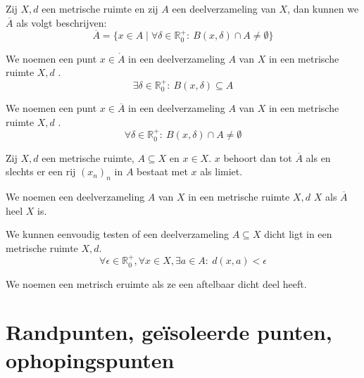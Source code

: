 \documentclass[main.tex]{subfiles}
\begin{document}
\begin{pr}
  Zij $X,d$ een metrische ruimte en zij $A$ een deelverzameling van $X$, dan kunnen we $\overline{A}$ als volgt beschrijven:
  \[ \overline{A} = \{ x\in A \mid \forall \delta \in \mathbb{R}_{0}^{+}:\ B(x,\delta) \cap A \neq \emptyset \} \]
\end{pr}

\begin{de}
  We noemen een punt $x\in \mathring{A}$ in een deelverzameling $A$ van $X$ in een metrische ruimte $X,d$ .
  \[ \exists \delta \in \mathbb{R}_{0}^{+}:\ B(x,\delta) \subseteq A \]
\end{de}

\begin{de}
  We noemen een punt $x\in \overline{A}$ in een deelverzameling $A$ van $X$ in een metrische ruimte $X,d$ .
  \[ \forall \delta \in \mathbb{R}_{0}^{+}:\ B(x,\delta) \cap A \neq \emptyset \]
\end{de}

\begin{pr}
  \label{pr:metrische-ruimte-sluiting-itv-limiet}
  Zij $X,d$ een metrische ruimte, $A \subseteq X$ en $x\in X$.
  $x$ behoort dan tot $\overline{A}$ als en slechts er een rij $(x_{n})_{n}$ in $A$ bestaat met $x$ als limiet.
\end{pr}

\begin{de}
  We noemen een deelverzameling $A$ van $X$ in een metrische ruimte $X,d$  $X$ als $\overline{A}$ heel $X$ is.
\end{de}

\begin{st}
  \label{st:metrische-ruimte-dicht-in-test}
  We kunnen eenvoudig testen of een deelverzameling $A\subseteq X$ dicht ligt in een metrische ruimte $X,d$.
  \[ \forall \epsilon \in \mathbb{R}_{0}^{+}, \forall x\in X, \exists a\in A:\ d(x,a) < \epsilon \]
\end{st}

\begin{de}
  We noemen een metrisch eruimte  als ze een aftelbaar dicht deel heeft.
\end{de}


\section{Randpunten, ge\"isoleerde punten, ophopingspunten}
\label{sec:randp-geis-punt}
\end{document}

